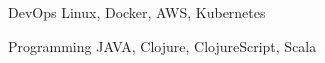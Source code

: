 

\begin{cvskills}

  \cvskill
    {DevOps} %
    {Linux, Docker, AWS, Kubernetes} %

  \cvskill
    {Programming} %
    {JAVA, Clojure, ClojureScript, Scala} %


\end{cvskills}
